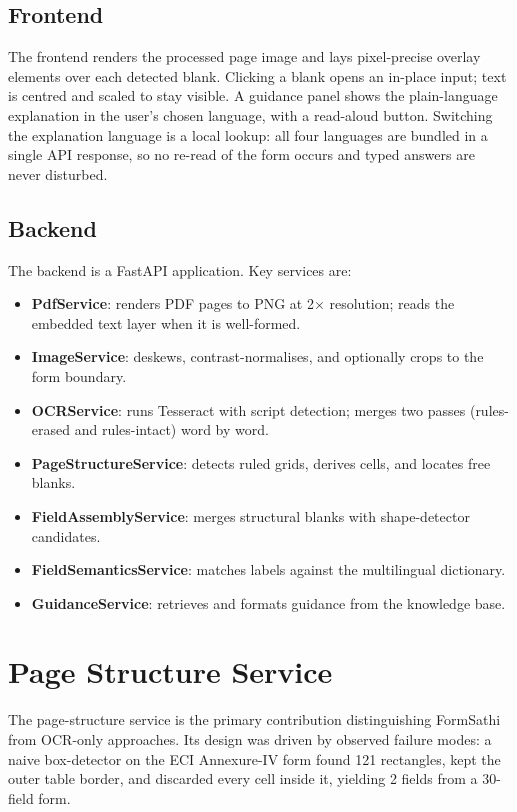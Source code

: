 \documentclass[conference]{IEEEtran}
\begin{document}
\subsection{Frontend}

The frontend renders the processed page image and lays pixel-precise overlay elements over each detected blank. Clicking a blank opens an in-place input; text is centred and scaled to stay visible. A guidance panel shows the plain-language explanation in the user's chosen language, with a read-aloud button. Switching the explanation language is a local lookup: all four languages are bundled in a single API response, so no re-read of the form occurs and typed answers are never disturbed.

\subsection{Backend}

The backend is a FastAPI application. Key services are:
\begin{itemize}
  \item \textbf{PdfService}: renders PDF pages to PNG at 2× resolution; reads the embedded text layer when it is well-formed.
  \item \textbf{ImageService}: deskews, contrast-normalises, and optionally crops to the form boundary.
  \item \textbf{OCRService}: runs Tesseract with script detection; merges two passes (rules-erased and rules-intact) word by word.
  \item \textbf{PageStructureService}: detects ruled grids, derives cells, and locates free blanks.
  \item \textbf{FieldAssemblyService}: merges structural blanks with shape-detector candidates.
  \item \textbf{FieldSemanticsService}: matches labels against the multilingual dictionary.
  \item \textbf{GuidanceService}: retrieves and formats guidance from the knowledge base.
\end{itemize}

\section{Page Structure Service}
\label{sec:pagestructure}

The page-structure service is the primary contribution distinguishing FormSathi from OCR-only approaches. Its design was driven by observed failure modes: a naive box-detector on the ECI Annexure-IV form found 121 rectangles, kept the outer table border, and discarded every cell inside it, yielding 2 fields from a 30-field form.
\end{document}
